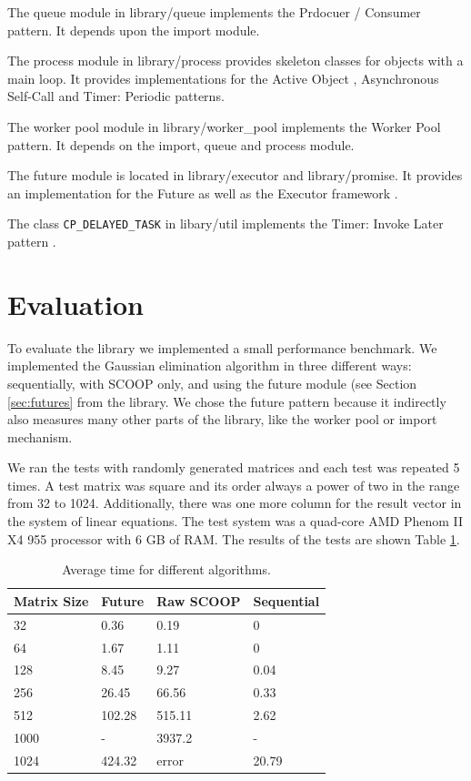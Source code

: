 \documentclass[a4paper,10pt]{article}
\newcommand{\dir} [1] [] {\emph{#1}}
\begin{document}
The queue module in \dir{library/queue} implements the Prdocuer / Consumer  pattern.
It depends upon the import module.

The process module in \dir{library/process} provides skeleton classes for objects with a main loop.
It provides implementations for the Active Object , Asynchronous Self-Call  and Timer: Periodic  patterns.

The worker pool module in \dir{library/worker\_pool} implements the Worker Pool  pattern.
It depends on the import, queue and process module.

The future module is located in \dir{library/executor} and \dir{library/promise}.
It provides an implementation for the Future  as well as the Executor framework .

The class \lstinline!CP_DELAYED_TASK! in \dir{libary/util} implements the Timer: Invoke Later pattern .



\section{Evaluation}
\label {sec:evaluation}

To evaluate the library we implemented a small performance benchmark.
We implemented the Gaussian elimination algorithm in three different ways: sequentially, with SCOOP only, and using the future module (see Section \ref{sec:futures} from the library.
We chose the future pattern because it indirectly also measures many other parts of the library, like the worker pool or import mechanism.

We ran the tests with randomly generated matrices and each test was repeated 5 times.
A test matrix was square and its order always a power of two in the range from 32 to 1024.
Additionally, there was one more column for the result vector in the system of linear equations.
The test system was a quad-core AMD Phenom II X4 955 processor with 6 GB of RAM.
The results of the tests are shown Table \ref{table:perf-results}.

\begin{table} [!h]
\centering
\begin{tabular}{|l|l l l|} 
\hline
Matrix Size & Future & Raw SCOOP & Sequential\\
\hline
32 & 0.36 & 0.19 & 0\\
64 & 1.67 & 1.11 & 0\\
128 & 8.45 & 9.27 & 0.04\\
256 & 26.45 & 66.56 & 0.33\\
512 & 102.28 & 515.11 & 2.62\\
1000 & - &  3937.2 & - \\
1024 & 424.32 & error & 20.79 \\
\hline
\end{tabular}
\caption{Average time for different algorithms.}
\label{table:perf-results}
\end{table}
\end{document}
